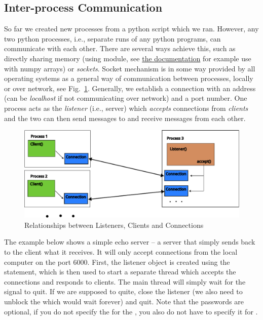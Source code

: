 \subsection{Inter-process Communication}
So far we created new processes from a python script which we ran. However, any two python processes, i.e., separate runs of any python programs, can communicate with each other. There are several ways achieve this, such as directly sharing memory (using  module, see \href{https://docs.python.org/3/library/multiprocessing.shared_memory.html}{the documentation} for example use with numpy arrays) or \emph{sockets}. Socket mechanism is in some way provided by all operating systems as a general way of communication between processes, locally or over network, see Fig.~\ref{fig:listener-client}. Generally, we establish a connection with an address (can be \emph{localhost} if not communicating over network) and a port number. One process acts as the \emph{listener} (i.e., server) which \emph{accepts} connections from \emph{clients} and the two can then send messages to and receive messages from each other.

\begin{figure}
    \label{fig:listener-client}
    \includegraphics[width=\textwidth]{listener_client.pdf}
    \caption{Relationships between Listeners, Clients and Connections}
\end{figure}

The example below shows a simple echo server -- a server that simply sends back to the client what it receives. It will only accept connections from the local computer on the port 6000. First, the listener object is created using the  statement, which is then used to start a separate thread which accepts the connections and responds to clients. The main thread will simply wait for the signal to quit. If we are supposed to quite, close the listener (we also need to unblock the  which would wait forever) and quit. Note that the passwords are optional, if you do not specify the  for the , you also do not have to specify it for .

